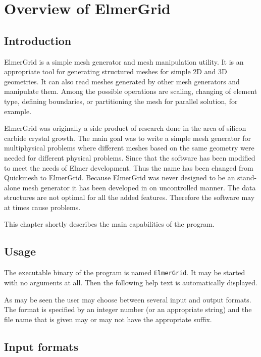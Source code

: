 \chapter{Overview of ElmerGrid}

\section{Introduction}

ElmerGrid is a simple mesh generator and 
mesh manipulation utility. 
It is an appropriate tool for generating structured meshes for 
simple 2D and 3D geometries. 
It can also read meshes generated by other mesh generators and 
manipulate them. Among the possible operations are
scaling, changing of element type, 
defining boundaries, or partitioning the mesh for parallel solution, 
for example.

ElmerGrid was originally a side product of research done in the area
of silicon carbide crystal growth.
The main goal was to write a simple mesh generator for multiphysical
problems where different meshes based on the same geometry were needed for different physical problems.
Since that the software has been modified to meet the 
needs of Elmer development.
Thus the name has been changed from Quickmesh to ElmerGrid.
Because ElmerGrid was never designed to be an stand-alone mesh generator 
it has been developed in on uncontrolled manner. The data structures 
are not optimal for all the added features. Therefore the software may
at times cause problems.

This chapter shortly describes the main 
capabilities of the program.


\section{Usage}
The executable binary of the program is named {\tt ElmerGrid}.
It may be started with no arguments at
all. Then the following help text is automatically 
displayed.



As may be seen the user may choose between several 
input and output formats. The format is specified 
by an integer number (or an appropriate string) and the file name that is given may 
or may not have the appropriate suffix.


\section{Input formats}

